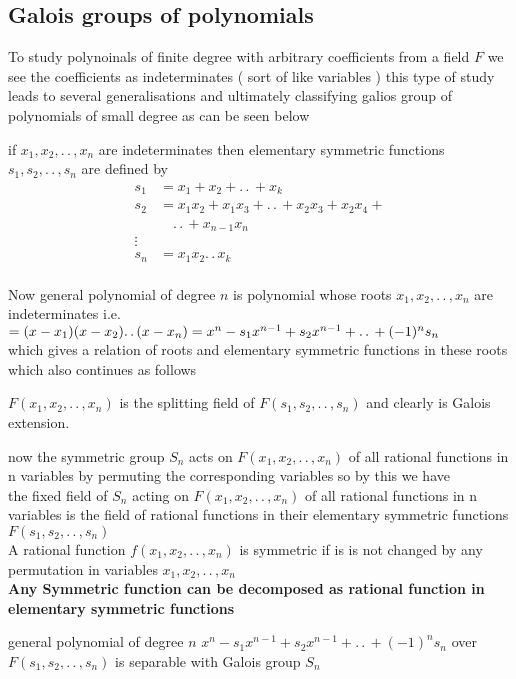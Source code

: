 \documentclass[11pt]{extarticle}
\newcommand{\ck}{.\,.\,}
\newcommand{\tbx}[2][]{
\begin{tcolorbox}[enhanced,breakable,size=small,colback=black!2!white,title={#1},arc is angular, arc=1.5mm,drop fuzzy shadow]
	#2
\end{tcolorbox}
}
\begin{document}
\begin{multicols}{2}
\subsection{Galois groups of polynomials}
\tbx{ To study polynoinals of finite degree with arbitrary coefficients from a field $ F $ we see the coefficients as indeterminates ( sort of like variables )  this type of study leads to several generalisations and ultimately classifying galios group of polynomials of small degree as can be seen below}
\tbx[elementary symmetric functions]{ if $ x_1,x_2,\ck ,x_n $ are indeterminates then  elementary symmetric functions $ s_1,s_2,\ck , s_n$ are defined by 
\begin{align*}
	s_1 &= x_1+x_2+\ck+x_k\\
	s_2 &= x_1x_2+x_1x_3+\ck+x_2x_3+x_2x_4+\\
	& \quad\ck+x_{n-1}x_n\\
	\vdots\\
	s_n&= x_1x_2\ck x_k\\
	\end{align*} }
\tbx{ Now general polynomial of degree $ n $ is polynomial whose roots $ x_1,x_2,\ck ,x_n $ are indeterminates i.e.\\
$ =(x-x_1)(x-x_2)\ck (x-x_n)\\
= x^n-s_1x^{n-1}+s_2x^{n-1}+\ck+(-1)^ns_n$ \\
which gives a relation of roots and elementary symmetric functions in these roots which also continues as follows}
\tbx{ $ F(x_1,x_2,\ck,x_n) $  is the splitting field of $ F(s_1,s_2,\ck,s_n) $ and clearly is Galois extension.}
\tbx{ now the symmetric group $ S_n $ acts on $ F(x_1,x_2,\ck,x_n) $ of all rational functions in n variables  by permuting the corresponding variables so by this we have \\
the fixed field of $ S_n $  acting on $ F(x_1,x_2,\ck,x_n) $ of all rational functions in n variables  is the field of rational functions in their elementary symmetric functions  $ F(s_1,s_2,\ck,s_n) $ 
\\
A rational function  $ f(x_1,x_2,\ck,x_n) $  is symmetric if is is not changed by any permutation in variables  $x_1,x_2,\ck,x_n$\\
\textbf{Any Symmetric function can be decomposed as rational function in elementary symmetric functions} }
\tbx[Existence of $ S_n $ Galois group]{ general polynomial of degree $ n $ $x^n-s_1x^{n-1}+s_2x^{n-1}+\ck+(-1)^ns_n$
over $ F(s_1,s_2,\ck,s_n) $ is separable with Galois group $ S_n $\\
}
\end{multicols}
\end{document}
